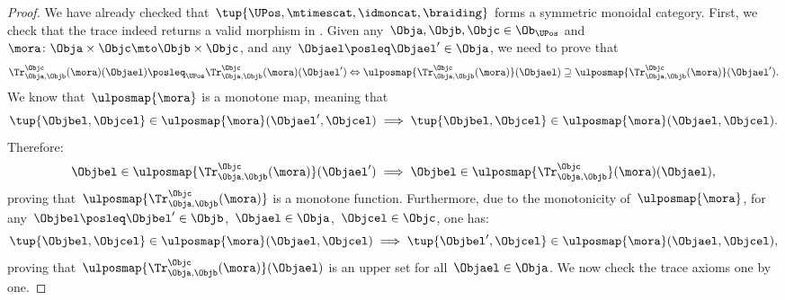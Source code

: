 \begin{proof}
    We have already checked that~$\tup{\UPos,\mtimescat, \idmoncat,\braiding}$ forms a symmetric monoidal category.
    First, we check that the trace indeed returns a valid morphism in \UPos.
    Given any~$\Obja,\Objb,\Objc\in \Ob_{\UPos}$ and~$\mora\colon \Obja\times \Objc \mto \Objb\times \Objc$,
    and any~$\Objael\posleq \Objael'\in \Obja$, we need to prove that
    \begin{equation*}
        \Tr_{\Obja,\Objb}^{\Objc}(\mora)(\Objael) \posleq_{\UPos}  \Tr_{\Obja,\Objb}^{\Objc}(\mora)(\Objael') \Leftrightarrow \ulposmap{\Tr_{\Obja,\Objb}^{\Objc}(\mora)}(\Objael) \supseteq \ulposmap{\Tr_{\Obja,\Objb}^{\Objc}(\mora)}(\Objael').
    \end{equation*}
    We know that~$\ulposmap{\mora}$ is a monotone map, meaning that
    \begin{equation*}
        \tup{\Objbel,\Objcel} \in \ulposmap{\mora}(\Objael',\Objcel) \implies \tup{\Objbel,\Objcel}\in \ulposmap{\mora}(\Objael,\Objcel).
    \end{equation*}
    Therefore:
    \begin{equation*}
        \Objbel \in \ulposmap{\Tr_{\Obja,\Objb}^{\Objc}(\mora)}(\Objael') \implies \Objbel \in \ulposmap{\Tr_{\Obja,\Objb}^{\Objc}}(\mora)(\Objael),
    \end{equation*}
    proving that~$\ulposmap{\Tr_{\Obja,\Objb}^{\Objc}(\mora)}$ is a monotone function.
    Furthermore, due to the monotonicity of~$\ulposmap{\mora}$, for any~$\Objbel\posleq \Objbel'\in \Objb$,~$\Objael\in \Obja$,~$\Objcel \in \Objc$, one has:
    \begin{equation*}
        \tup{\Objbel,\Objcel}\in \ulposmap{\mora}(\Objael,\Objcel)\implies \tup{\Objbel',\Objcel}\in \ulposmap{\mora}(\Objael,\Objcel),
    \end{equation*}
    proving that~$\ulposmap{\Tr_{\Obja,\Objb}^{\Objc}(\mora)}(\Objael)$ is an upper set for all~$\Objael\in \Obja$.
    We now check the trace axioms one by one.


\end{proof}
